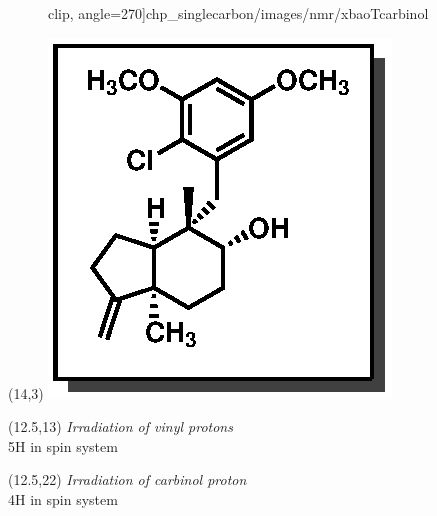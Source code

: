 \begin{textblock}{20}
\begin{figure}[htb]
clip, angle=270]{chp_singlecarbon/images/nmr/xbaoTcarbinol}
\vspace{-100pt}
\end{figure}
\end{textblock}
\begin{textblock}{1}(14,3)
\includegraphics[scale=0.8]{chp_singlecarbon/images/xbao}
\end{textblock}
\begin{textblock}{9}(12.5,13)
\centering \textsf{\small \textit{Irradiation of vinyl protons}\\5H in spin system}
\end{textblock}
\begin{textblock}{9}(12.5,22)
\centering \textsf{\small \textit{Irradiation of carbinol proton}\\4H in spin system}
\end{textblock}
\clearpage

